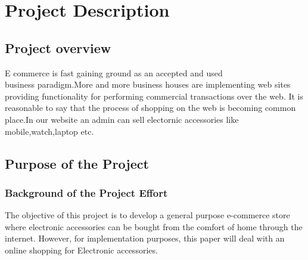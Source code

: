 \documentclass{article}
\begin{document}
\newpage
 

\section{Project Description}

\subsection{Project overview}
E commerce is fast gaining ground as an accepted and used \\ business
paradigm.More and more business houses are implementing web sites
providing functionality for performing commercial transactions over the web. It is reasonable to say that the process of shopping on the web is becoming common place.In our website an admin can sell electornic accessories like mobile,watch,laptop etc.

\subsection{Purpose of the Project}
\subsubsection{Background of the Project Effort}
The objective of this project is to develop a general purpose e-commerce store where electronic accessories   can be bought from the comfort of home through the internet. However, for implementation purposes, this paper will deal with an online shopping for Electronic accessories.
\end{document}
